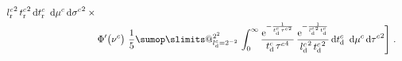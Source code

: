 \documentclass[\ifafour a4paper,12pt,\else a5paper,10pt,\fi%
onecolumn,oneside,article,%
british%
]{memoir}
\makeatletter
\theoremstyle{remark}
\theoremstyle{innote}
\def\sum{\DOTSI\sumop\slimits@}
\newcommand*{\de}{\partialup}%
\newcommand*{\e}{\ensuremath{\mathrm{e}}}
\newcommand*{\di}{\mathrm{d}}%
\newcommand*{\p}{\mathrm{p}}%
\renewcommand*{\|}[1][]{\nonscript\:#1\vert\nonscript\:\mathopen{}}
\newcommand*{\tsum}{\mathop{\textstyle\sum}\nolimits}
\newcommand*{\sigmar}{\sigma}
\newcommand*{\mud}{\nu}
\newcommand*{\sigmad}{\tau}
\newcommand*{\vr}{\textrm{r}}
\newcommand*{\vd}{\textrm{d}}
\makeatother
\begin{document}
\begin{table}
\begin{multline}
\begin{aligned}[b]
{        {l_{\vr}^{c}}^{2}\,{t_{\vr}^{c}}^{2}
      }\,\di t_{\vr} ^{c}
      \enspace \di\mu^{c}\,\di{\sigmar^{c}}^{2}
      \times{}\\
      &
      \Phi'\bigl(\mud^{c}\bigr)\ 
      \frac{1}{5}\sum_{l_{\vd}^{c}=2^{-2}}^{2^{2}}\,
      \int_{0}^{\infty}
      \frac{\e^{-\frac{1}{t_{\vd}^{c}\,{\sigmad^{c}}^{2}}}}{
        t_{\vd}^{c}\,{\sigmad^{c}}^{4}
      }\,
      \frac{\e^{-\frac{1}{{l_{\vd}^{c}}^{2}\,t_{\vd}^{c}}}}{
        {l_{\vd}^{c}}^{2}\,{t_{\vd}^{c}}^{2}
      }\,\di t_{\vd} ^{c}
      \enspace \di\mu^{c}\,\di{\sigmad^{c}}^{2}
      \Biggr] \ .
    \end{aligned}
  \end{multline}
\end{table}

 






\end{document}
